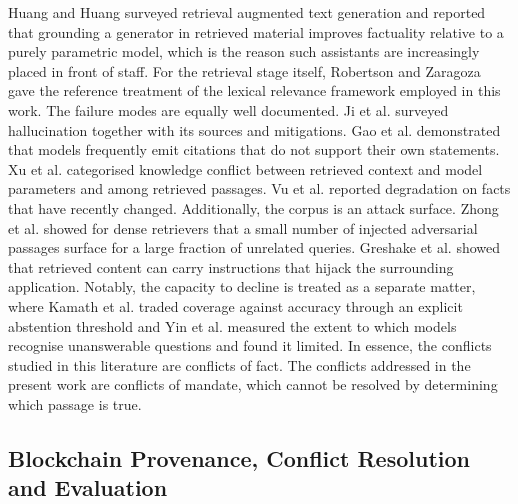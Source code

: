 \documentclass[journal]{IEEEtran}
\begin{document}
Huang and Huang \cite{huang2026ragsurvey} surveyed retrieval augmented text generation and reported that grounding a generator in retrieved material improves factuality relative to a purely parametric model, which is the reason such assistants are increasingly placed in front of staff. For the retrieval stage itself, Robertson and Zaragoza \cite{robertson2009bm25} gave the reference treatment of the lexical relevance framework employed in this work. The failure modes are equally well documented. Ji et al. \cite{ji2023hallucination} surveyed hallucination together with its sources and mitigations. Gao et al. \cite{gao2023citations} demonstrated that models frequently emit citations that do not support their own statements. Xu et al. \cite{xu2024conflicts} categorised knowledge conflict between retrieved context and model parameters and among retrieved passages. Vu et al. \cite{vu2024freshllms} reported degradation on facts that have recently changed. Additionally, the corpus is an attack surface. Zhong et al. \cite{zhong2023poisoning} showed for dense retrievers that a small number of injected adversarial passages surface for a large fraction of unrelated queries. Greshake et al. \cite{greshake2023injection} showed that retrieved content can carry instructions that hijack the surrounding application. Notably, the capacity to decline is treated as a separate matter, where Kamath et al. \cite{kamath2020selective} traded coverage against accuracy through an explicit abstention threshold and Yin et al. \cite{yin2023knowunknown} measured the extent to which models recognise unanswerable questions and found it limited. In essence, the conflicts studied in this literature are conflicts of fact. The conflicts addressed in the present work are conflicts of mandate, which cannot be resolved by determining which passage is true.

\subsection{Blockchain Provenance, Conflict Resolution and Evaluation}
\end{document}
